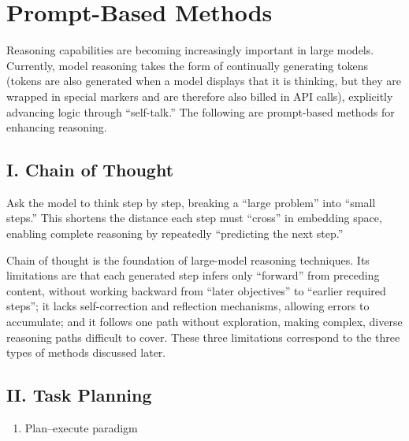 \setcounter{section}{0}

\hypertarget{prompt-based-methods}{%
\section{Prompt-Based Methods}\label{prompt-based-methods}}

Reasoning capabilities are becoming increasingly important in large models. Currently, model reasoning takes the form of continually generating tokens (tokens are also generated when a model displays that it is thinking, but they are wrapped in special markers and are therefore also billed in API calls), explicitly advancing logic through ``self-talk.'' The following are prompt-based methods for enhancing reasoning.

\hypertarget{i.-chain-of-thought}{%
\subsection{I. Chain of Thought}\label{i.-chain-of-thought}}

Ask the model to think step by step, breaking a ``large problem'' into ``small steps.'' This shortens the distance each step must ``cross'' in embedding space, enabling complete reasoning by repeatedly ``predicting the next step.''

Chain of thought is the foundation of large-model reasoning techniques. Its limitations are that each generated step infers only ``forward'' from preceding content, without working backward from ``later objectives'' to ``earlier required steps''; it lacks self-correction and reflection mechanisms, allowing errors to accumulate; and it follows one path without exploration, making complex, diverse reasoning paths difficult to cover. These three limitations correspond to the three types of methods discussed later.

\hypertarget{ii.-task-planning}{%
\subsection{II. Task Planning}\label{ii.-task-planning}}

\begin{enumerate}
\def\labelenumi{\arabic{enumi}.}
\tightlist
\item
  Plan--execute paradigm
\end{enumerate}


